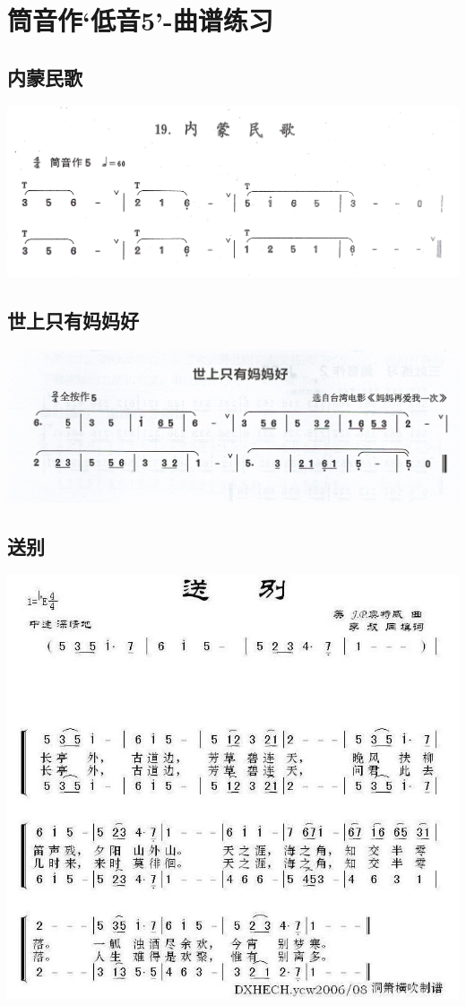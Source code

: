 \documentclass[cn,pad,chinese,chinesefont=nofont]{elegantbook}
\begin{document}
\chapter{筒音作‘低音5’-曲谱练习}
\section{内蒙民歌}
	\includegraphics[width=\textwidth]{dongxiao/IMG0944内蒙民歌.jpg}  
\section{世上只有妈妈好}
	\includegraphics[width=\textwidth]{dongxiao/Scan 17-1.jpeg}
\section{送别}
    \includegraphics[width=\textwidth]{dongxiao/20200324送别.jpg}  
\end{document}
